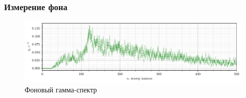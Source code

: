 


\subsubsection*{Измерение фона}

\begin{figure}[h]
    \centering
    \includegraphics[width=\textwidth]{figures/bbb.pdf}
    \caption{Фоновый гамма-спектр}
    \label{fig:background}
\end{figure}
